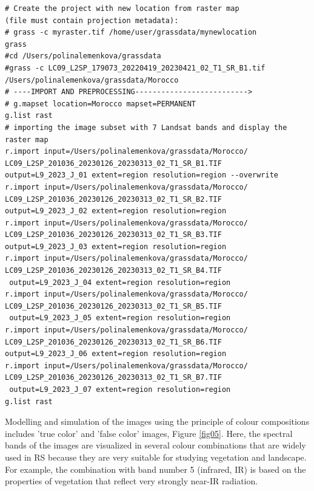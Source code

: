 \documentclass[geomatics,article,submit,pdftex,moreauthors]{Definitions/mdpi}
\begin{document}
\begin{footnotesize}
\begin{verbatim}
# Create the project with new location from raster map 
(file must contain projection metadata):
# grass -c myraster.tif /home/user/grassdata/mynewlocation
grass
#cd /Users/polinalemenkova/grassdata
#grass -c LC09_L2SP_179073_20220419_20230421_02_T1_SR_B1.tif 
/Users/polinalemenkova/grassdata/Morocco
# ----IMPORT AND PREPROCESSING-------------------------->
# g.mapset location=Morocco mapset=PERMANENT
g.list rast
# importing the image subset with 7 Landsat bands and display the raster map
r.import input=/Users/polinalemenkova/grassdata/Morocco/
LC09_L2SP_201036_20230126_20230313_02_T1_SR_B1.TIF 
output=L9_2023_J_01 extent=region resolution=region --overwrite
r.import input=/Users/polinalemenkova/grassdata/Morocco/
LC09_L2SP_201036_20230126_20230313_02_T1_SR_B2.TIF 
output=L9_2023_J_02 extent=region resolution=region
r.import input=/Users/polinalemenkova/grassdata/Morocco/
LC09_L2SP_201036_20230126_20230313_02_T1_SR_B3.TIF 
output=L9_2023_J_03 extent=region resolution=region
r.import input=/Users/polinalemenkova/grassdata/Morocco/
LC09_L2SP_201036_20230126_20230313_02_T1_SR_B4.TIF
 output=L9_2023_J_04 extent=region resolution=region
r.import input=/Users/polinalemenkova/grassdata/Morocco/
LC09_L2SP_201036_20230126_20230313_02_T1_SR_B5.TIF
 output=L9_2023_J_05 extent=region resolution=region
r.import input=/Users/polinalemenkova/grassdata/Morocco/
LC09_L2SP_201036_20230126_20230313_02_T1_SR_B6.TIF 
output=L9_2023_J_06 extent=region resolution=region
r.import input=/Users/polinalemenkova/grassdata/Morocco/
LC09_L2SP_201036_20230126_20230313_02_T1_SR_B7.TIF
 output=L9_2023_J_07 extent=region resolution=region
g.list rast
\end{verbatim}
\end{footnotesize}

Modelling and simulation of the images using the principle of colour compositions includes 'true color' and 'false color' images, Figure \ref{fig05}. Here, the spectral bands of the images are visualized in several colour combinations that are widely used in RS because they are very suitable for studying vegetation and landscape. For example, the combination with band number 5 (infrared, IR) is based on the properties of vegetation that reflect very strongly near-IR radiation.
\end{document}
